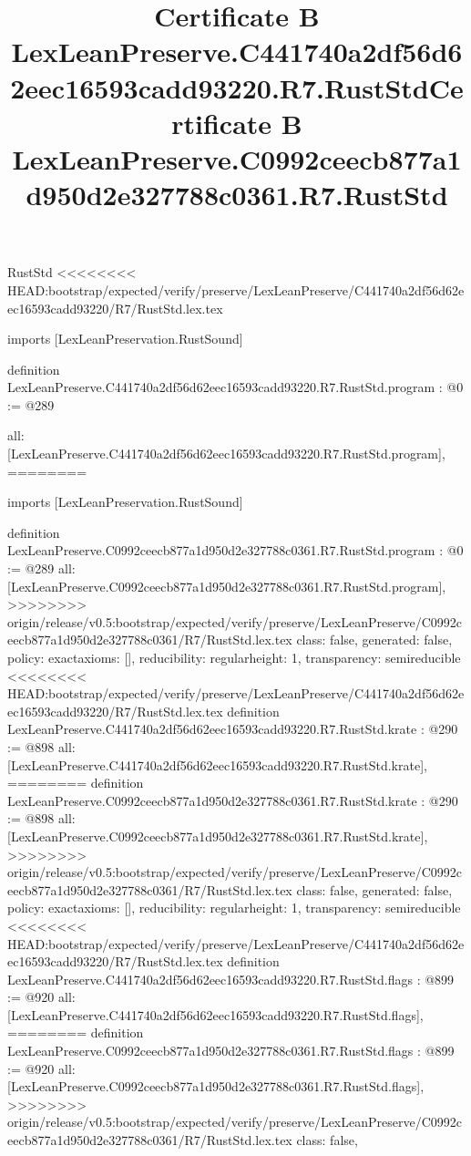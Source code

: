 \begin{lexlean}{RustStd}
<<<<<<<< HEAD:bootstrap/expected/verify/preserve/LexLeanPreserve/C441740a2df56d62eec16593cadd93220/R7/RustStd.lex.tex
\title{Certificate B LexLeanPreserve.C441740a2df56d62eec16593cadd93220.R7.RustStd}
\begin{coremodule}
imports [LexLeanPreservation.RustSound]

definition LexLeanPreserve.C441740a2df56d62eec16593cadd93220.R7.RustStd.program : @0 := @289 {
  all: [LexLeanPreserve.C441740a2df56d62eec16593cadd93220.R7.RustStd.program],
========
\title{Certificate B LexLeanPreserve.C0992ceecb877a1d950d2e327788c0361.R7.RustStd}
\begin{coremodule}
imports [LexLeanPreservation.RustSound]

definition LexLeanPreserve.C0992ceecb877a1d950d2e327788c0361.R7.RustStd.program : @0 := @289 {
  all: [LexLeanPreserve.C0992ceecb877a1d950d2e327788c0361.R7.RustStd.program],
>>>>>>>> origin/release/v0.5:bootstrap/expected/verify/preserve/LexLeanPreserve/C0992ceecb877a1d950d2e327788c0361/R7/RustStd.lex.tex
  class: false,
  generated: false,
  policy: exact{axioms: []},
  reducibility: regular{height: 1},
  transparency: semireducible
}
<<<<<<<< HEAD:bootstrap/expected/verify/preserve/LexLeanPreserve/C441740a2df56d62eec16593cadd93220/R7/RustStd.lex.tex
definition LexLeanPreserve.C441740a2df56d62eec16593cadd93220.R7.RustStd.krate : @290 := @898 {
  all: [LexLeanPreserve.C441740a2df56d62eec16593cadd93220.R7.RustStd.krate],
========
definition LexLeanPreserve.C0992ceecb877a1d950d2e327788c0361.R7.RustStd.krate : @290 := @898 {
  all: [LexLeanPreserve.C0992ceecb877a1d950d2e327788c0361.R7.RustStd.krate],
>>>>>>>> origin/release/v0.5:bootstrap/expected/verify/preserve/LexLeanPreserve/C0992ceecb877a1d950d2e327788c0361/R7/RustStd.lex.tex
  class: false,
  generated: false,
  policy: exact{axioms: []},
  reducibility: regular{height: 1},
  transparency: semireducible
}
<<<<<<<< HEAD:bootstrap/expected/verify/preserve/LexLeanPreserve/C441740a2df56d62eec16593cadd93220/R7/RustStd.lex.tex
definition LexLeanPreserve.C441740a2df56d62eec16593cadd93220.R7.RustStd.flags : @899 := @920 {
  all: [LexLeanPreserve.C441740a2df56d62eec16593cadd93220.R7.RustStd.flags],
========
definition LexLeanPreserve.C0992ceecb877a1d950d2e327788c0361.R7.RustStd.flags : @899 := @920 {
  all: [LexLeanPreserve.C0992ceecb877a1d950d2e327788c0361.R7.RustStd.flags],
>>>>>>>> origin/release/v0.5:bootstrap/expected/verify/preserve/LexLeanPreserve/C0992ceecb877a1d950d2e327788c0361/R7/RustStd.lex.tex
  class: false,
}}}
\end{coremodule}}
\end{coremodule}
\end{lexlean}
